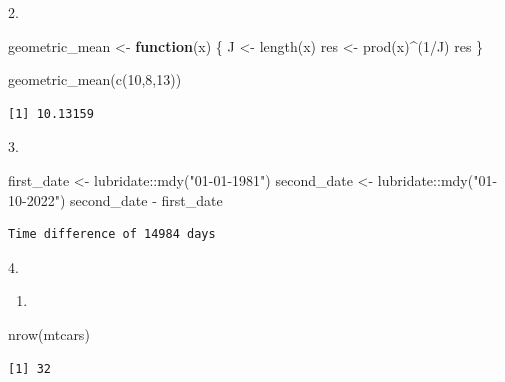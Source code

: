 \documentclass[
  letterpaper,
  DIV=11,
  numbers=noendperiod]{scrreprt}
\newenvironment{Shaded}{\begin{snugshade}}{\end{snugshade}}
\newcommand{\ControlFlowTok}[1]{\textcolor[rgb]{0.00,0.23,0.31}{\textbf{#1}}}
\newcommand{\DecValTok}[1]{\textcolor[rgb]{0.68,0.00,0.00}{#1}}
\newcommand{\FunctionTok}[1]{\textcolor[rgb]{0.28,0.35,0.67}{#1}}
\newcommand{\NormalTok}[1]{\textcolor[rgb]{0.00,0.23,0.31}{#1}}
\newcommand{\OtherTok}[1]{\textcolor[rgb]{0.00,0.23,0.31}{#1}}
\newcommand{\SpecialCharTok}[1]{\textcolor[rgb]{0.37,0.37,0.37}{#1}}
\newcommand{\StringTok}[1]{\textcolor[rgb]{0.13,0.47,0.30}{#1}}
\providecommand{\tightlist}{%
  \setlength{\itemsep}{0pt}\setlength{\parskip}{0pt}}\usepackage{longtable,booktabs,array}
\begin{document}
2.

\begin{Shaded}
\begin{Highlighting}[]
\NormalTok{geometric\_mean }\OtherTok{\textless{}{-}} \ControlFlowTok{function}\NormalTok{(x) \{}
\NormalTok{  J }\OtherTok{\textless{}{-}} \FunctionTok{length}\NormalTok{(x)}
\NormalTok{  res }\OtherTok{\textless{}{-}} \FunctionTok{prod}\NormalTok{(x)}\SpecialCharTok{\^{}}\NormalTok{(}\DecValTok{1}\SpecialCharTok{/}\NormalTok{J)}
\NormalTok{  res}
\NormalTok{\}}

\FunctionTok{geometric\_mean}\NormalTok{(}\FunctionTok{c}\NormalTok{(}\DecValTok{10}\NormalTok{,}\DecValTok{8}\NormalTok{,}\DecValTok{13}\NormalTok{))}
\end{Highlighting}
\end{Shaded}

\begin{verbatim}
[1] 10.13159
\end{verbatim}

3.

\begin{Shaded}
\begin{Highlighting}[]
\NormalTok{first\_date }\OtherTok{\textless{}{-}}\NormalTok{ lubridate}\SpecialCharTok{::}\FunctionTok{mdy}\NormalTok{(}\StringTok{"01{-}01{-}1981"}\NormalTok{)}
\NormalTok{second\_date }\OtherTok{\textless{}{-}}\NormalTok{ lubridate}\SpecialCharTok{::}\FunctionTok{mdy}\NormalTok{(}\StringTok{"01{-}10{-}2022"}\NormalTok{)}
\NormalTok{second\_date }\SpecialCharTok{{-}}\NormalTok{ first\_date}
\end{Highlighting}
\end{Shaded}

\begin{verbatim}
Time difference of 14984 days
\end{verbatim}

4.

\begin{enumerate}
\def\labelenumi{\alph{enumi})}
\tightlist
\item
\end{enumerate}

\begin{Shaded}
\begin{Highlighting}[]
\FunctionTok{nrow}\NormalTok{(mtcars)}
\end{Highlighting}
\end{Shaded}

\begin{verbatim}
[1] 32
\end{verbatim}
\end{document}
